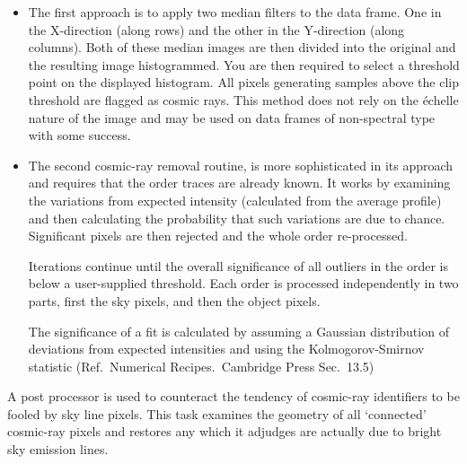 \documentclass[11pt,twoside]{article}
\newcommand{\myindex}[1]{\index{#1}}
\renewcommand{\myindex}[1]{}
\begin{document}
\begin{itemize}

\item The first approach is to apply two median filters to the data
      frame. One in the X-direction (along rows) and the other in the
      Y-direction (along columns). Both of these median images are then
      divided into the original and the resulting image histogrammed. You
      are then required to select a threshold point on the displayed
      histogram. All pixels generating samples above the clip threshold are
      flagged as cosmic rays. This method does not rely on the \'{e}chelle
      nature of the image and may be used on data frames of non-spectral
      type with some success.

\item The second cosmic-ray removal routine,  is more sophisticated in
      its approach and requires that the order traces are already known. It
      works by examining the variations from expected intensity (calculated
      from the average profile) and then calculating the probability that
      such variations are due to chance. Significant pixels are then
      rejected and the whole order re-processed.

      Iterations continue until the overall significance of all outliers in
      the order is below a user-supplied threshold. Each order is processed
      independently in two parts,  first the sky pixels,  and then the
      object pixels.

      The significance of a fit is calculated by assuming a Gaussian
      distribution of deviations from expected intensities and using the
      Kolmogorov-Smirnov statistic (Ref.\ Numerical Recipes.\ Cambridge Press
      Sec.~13.5)

\end{itemize}

A post processor is used to counteract the tendency of cosmic-ray
identifiers to be fooled by sky line pixels. This task examines the
geometry of all `connected' cosmic-ray pixels and restores any which it
adjudges are actually due to bright sky emission lines.
\myindex{Sky lines}
\end{document}

